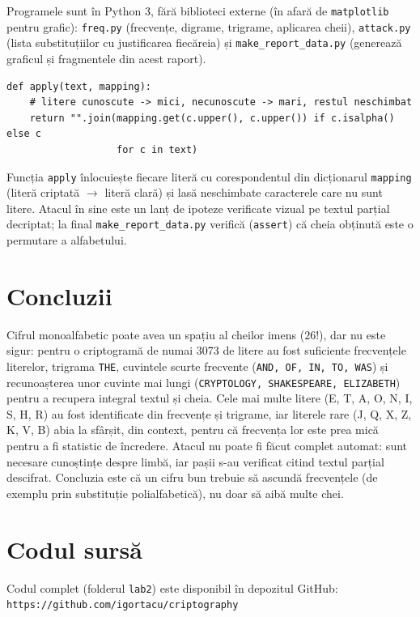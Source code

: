 \documentclass[12pt,a4paper]{article}
\newcommand{\code}[1]{\texttt{\small #1}}
\begin{document}
Programele sunt în Python 3, fără biblioteci externe (în afară de \code{matplotlib} pentru grafic):
\code{freq.py} (frecvențe, digrame, trigrame, aplicarea cheii), \code{attack.py} (lista
substituțiilor cu justificarea fiecăreia) și \code{make\_report\_data.py} (generează graficul
și fragmentele din acest raport).
\begin{lstlisting}
def apply(text, mapping):
    # litere cunoscute -> mici, necunoscute -> mari, restul neschimbat
    return "".join(mapping.get(c.upper(), c.upper()) if c.isalpha() else c
                   for c in text)
\end{lstlisting}
Funcția \code{apply} înlocuiește fiecare literă cu corespondentul din dicționarul
\code{mapping} (literă criptată $\to$ literă clară) și lasă neschimbate caracterele care nu sunt litere.
Atacul în sine este un lanț de ipoteze verificate vizual pe textul parțial decriptat; la final
\code{make\_report\_data.py} verifică (\code{assert}) că cheia obținută este o permutare a alfabetului.

\section{Concluzii}

Cifrul monoalfabetic poate avea un spațiu al cheilor imens ($26!$), dar nu este sigur:
pentru o criptogramă de numai 3073 de litere au fost suficiente frecvențele literelor,
trigrama \texttt{THE}, cuvintele scurte frecvente (\texttt{AND, OF, IN, TO, WAS}) și recunoașterea
unor cuvinte mai lungi (\texttt{CRYPTOLOGY, SHAKESPEARE, ELIZABETH}) pentru a recupera integral
textul și cheia. Cele mai multe litere (E, T, A, O, N, I, S, H, R) au fost identificate din
frecvențe și trigrame, iar literele rare (J, Q, X, Z, K, V, B) abia la sfârșit, din context,
pentru că frecvența lor este prea mică pentru a fi statistic de încredere. Atacul nu poate fi
făcut complet automat: sunt necesare cunoștințe despre limbă, iar pașii s-au verificat citind
textul parțial descifrat. Concluzia este că un cifru bun trebuie să ascundă frecvențele
(de exemplu prin substituție polialfabetică), nu doar să aibă multe chei.

\section{Codul sursă}

Codul complet (folderul \texttt{lab2}) este disponibil în depozitul GitHub:\\
\texttt{https://github.com/igortacu/criptography}
\end{document}
